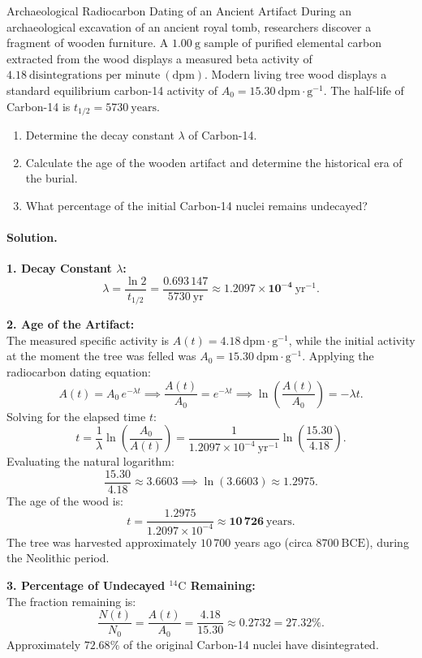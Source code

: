 \begin{workedexample}{Archaeological Radiocarbon Dating of an Ancient Artifact}
During an archaeological excavation of an ancient royal tomb, researchers discover a fragment of wooden furniture. A $1.00\ \mathrm{g}$ sample of purified elemental carbon extracted from the wood displays a measured beta activity of $4.18\ \text{disintegrations per minute}\ (\mathrm{dpm})$. Modern living tree wood displays a standard equilibrium carbon-14 activity of $A_0 = 15.30\ \mathrm{dpm\cdot g^{-1}}$. The half-life of Carbon-14 is $t_{1/2} = 5730\ \mathrm{years}$.
\begin{enumerate}[leftmargin=1.4em,itemsep=3pt]
  \item Determine the decay constant $\lambda$ of Carbon-14.
  \item Calculate the age of the wooden artifact and determine the historical era of the burial.
  \item What percentage of the initial Carbon-14 nuclei remains undecayed?
\end{enumerate}

\paragraph{Solution.}
\textbf{1. Decay Constant $\lambda$:}\\
\[
\lambda = \frac{\ln 2}{t_{1/2}} = \frac{0.693\,147}{5730\ \mathrm{yr}} \approx \mathbf{1.2097 \times 10^{-4}\ \mathrm{yr^{-1}}}.
\]

\textbf{2. Age of the Artifact:}\\
The measured specific activity is $A(t) = 4.18\ \mathrm{dpm\cdot g^{-1}}$, while the initial activity at the moment the tree was felled was $A_0 = 15.30\ \mathrm{dpm\cdot g^{-1}}$.
Applying the radiocarbon dating equation:
\[
A(t) = A_0\,e^{-\lambda t} \implies \frac{A(t)}{A_0} = e^{-\lambda t} \implies \ln\left( \frac{A(t)}{A_0} \right) = -\lambda t.
\]
Solving for the elapsed time $t$:
\[
t = \frac{1}{\lambda} \ln\left( \frac{A_0}{A(t)} \right) = \frac{1}{1.2097 \times 10^{-4}\ \mathrm{yr^{-1}}} \ln\left( \frac{15.30}{4.18} \right).
\]
Evaluating the natural logarithm:
\[
\frac{15.30}{4.18} \approx 3.6603 \implies \ln(3.6603) \approx 1.2975.
\]
The age of the wood is:
\[
t = \frac{1.2975}{1.2097 \times 10^{-4}} \approx \mathbf{10\,726\ \mathrm{years}}.
\]
The tree was harvested approximately $10\,700$ years ago (circa $8700\ \text{BCE}$), during the Neolithic period.

\textbf{3. Percentage of Undecayed $^{14}\mathrm{C}$ Remaining:}\\
The fraction remaining is:
\[
\frac{N(t)}{N_0} = \frac{A(t)}{A_0} = \frac{4.18}{15.30} \approx 0.2732 = \mathbf{27.32\%}.
\]
Approximately $72.68\%$ of the original Carbon-14 nuclei have disintegrated.
\end{workedexample}

